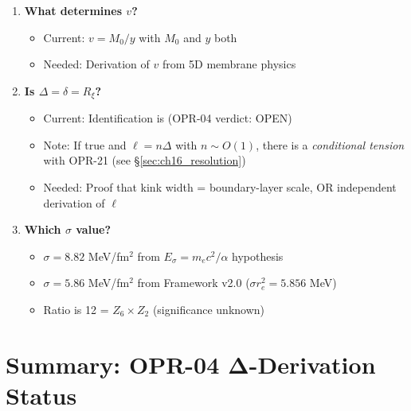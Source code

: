 \begin{enumerate}
    \item \textbf{What determines $v$?}
    \begin{itemize}[nosep]
        \item Current: $v = M_0/y$ with $M_0$ and $y$ both \tagP{}
        \item Needed: Derivation of $v$ from 5D membrane physics
    \end{itemize}

    \item \textbf{Is $\Delta = \delta = R_\xi$?}
    \begin{itemize}[nosep]
        \item Current: Identification is \tagP{} (OPR-04 verdict: OPEN)
        \item Note: If true and $\ell = n\Delta$ with $n \sim O(1)$, there is a
              \emph{conditional tension} with OPR-21 (see \S\ref{sec:ch16_resolution})
        \item Needed: Proof that kink width = boundary-layer scale, OR
              independent derivation of $\ell$
    \end{itemize}

    \item \textbf{Which $\sigma$ value?}
    \begin{itemize}[nosep]
        \item $\sigma = 8.82$ MeV/fm$^2$ from $E_\sigma = m_e c^2/\alpha$ hypothesis
        \item $\sigma = 5.86$ MeV/fm$^2$ from Framework v2.0 ($\sigma r_e^2 = 5.856$ MeV)
        \item Ratio is 12 = $Z_6 \times Z_2$ (significance unknown)
    \end{itemize}
\end{enumerate}

\section{Summary: OPR-04 Δ-Derivation Status}
\label{sec:ch16_summary}

